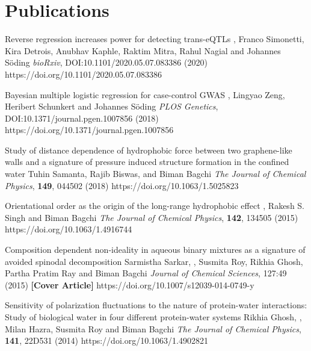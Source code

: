 \section{Publications}
%
        {Reverse regression increases power for detecting trans-eQTLs}
        {\selfauthor{}, Franco Simonetti, Kira Detrois, Anubhav Kaphle, Raktim Mitra, Rahul Nagial and Johannes S\"oding}
        {{\slshape bioRxiv}, DOI:10.1101/2020.05.07.083386 (2020)}
        {https://doi.org/10.1101/2020.05.07.083386}

%
        {Bayesian multiple logistic regression for case-control GWAS}
        {\selfauthor{}, Lingyao Zeng, Heribert Schunkert and Johannes S\"oding}
        {{\slshape PLOS Genetics}, DOI:10.1371/journal.pgen.1007856 (2018)}
        {https://doi.org/10.1371/journal.pgen.1007856}

%
        {Study of distance dependence of hydrophobic force between two graphene-like walls and a signature of pressure induced structure formation in the confined water}
        {Tuhin Samanta, Rajib Biswas, \selfauthor{} and Biman Bagchi}
        {{\slshape The Journal of Chemical Physics}, {\bfseries 149}, 044502 (2018)}
        {https://doi.org/10.1063/1.5025823}

%
        {Orientational order as the origin of the long-range hydrophobic effect}
        {\selfauthor{}, Rakesh S. Singh and Biman Bagchi}
        {{\slshape The Journal of Chemical Physics}, {\bfseries 142}, 134505 (2015)}
        {https://doi.org/10.1063/1.4916744}

%
        {Composition dependent non-ideality in aqueous binary mixtures
        as a signature of avoided spinodal decomposition}
        {Sarmistha Sarkar, \selfauthor{}, Susmita Roy, Rikhia Ghosh, Partha Pratim Ray and Biman Bagchi}
        {{\slshape Journal of Chemical Sciences}, 127:49 (2015) {\bfseries [Cover Article]}}
        {https://doi.org/10.1007/s12039-014-0749-y}

%
        {Sensitivity of polarization fluctuations to the nature of protein-water interactions:
        Study of biological water in four different protein-water systems}
        {Rikhia Ghosh, \selfauthor{}, Milan Hazra, Susmita Roy and Biman Bagchi}
        {{\slshape The Journal of Chemical Physics}, {\bfseries 141}, 22D531 (2014)}
        {https://doi.org/10.1063/1.4902821}

